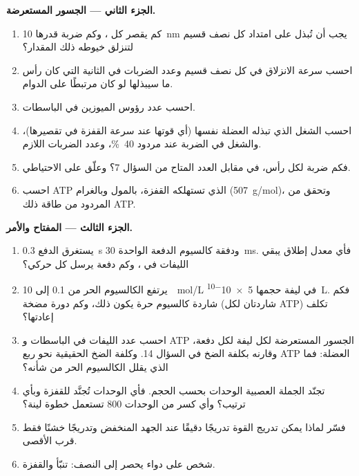 \begin{problem}
\medskip
\noindent\textbf{الجزء الثاني --- الجسور المستعرضة.}
\begin{enumerate}[resume]
  \item كم يقصر كل ، وكم ضربة قدرها
        \qty{10}{nm} يجب أن تُبذل على امتداد كل نصف قسيم
        لتنزلق خيوطه ذلك المقدار؟
  \item احسب سرعة الانزلاق في كل نصف قسيم وعدد
        الضربات في الثانية التي كان رأس ما سيبذلها لو كان
        مرتبطًا على الدوام.
  \item احسب عدد رؤوس الميوزين في الباسطات.
  \item احسب الشغل الذي تبذله العضلة نفسها (أي قوتها عند
        سرعة القفزة في تقصيرها)، والشغل في الضربة عند
        مردود \qty{40}{\%}، وعدد الضربات اللازم.
  \item فكم ضربة لكل رأس، في مقابل العدد
        المتاح من السؤال 7؟ وعلّق على الاحتياطي.
  \item احسب ATP الذي تستهلكه القفزة، بالمول وبالغرام
        (\qty{507}{g/mol})، وتحقق من المردود من طاقة
        ذلك ATP.
\end{enumerate}

\medskip
\noindent\textbf{الجزء الثالث --- المفتاح والأمر.}
\begin{enumerate}[resume]
  \item يستغرق الدفع \qty{0.3}{s} ودفقة كالسيوم الدفعة
        الواحدة \qty{30}{ms}. فأي معدل إطلاق يبقي الليفات في
        ، وكم دفعة يرسل كل  حركي؟
  \item يرتفع الكالسيوم الحر من \qty{0.1}{} إلى \qty{10}{\micro
        mol/L} في ليفة حجمها \qty{5e-10}{L}. فكم شاردة كالسيوم حرة
        يكون ذلك، وكم دورة مضخة (شاردتان لكل ATP) تكلف
        إعادتها؟
  \item احسب عدد الليفات في الباسطات و
        ATP الجسور المستعرضة لكل ليفة لكل دفعة، وقارنه
        بكلفة الضخ في السؤال 14. وكلفة الضخ الحقيقية نحو
        ربع ATP العضلة: فما الذي يقلل الكالسيوم الحر من شأنه؟
  \item تجنّد الجملة العصبية الوحدات بحسب الحجم. فأي الوحدات
        تُجنَّد للقفزة وبأي ترتيب؟ وأي كسر
        من الوحدات \num{800} تستعمل خطوة لينة؟
  \item فسّر لماذا يمكن تدريج القوة تدريجًا دقيقًا عند الجهد المنخفض
        وتدريجًا خشنًا فقط قرب الأقصى.
  \item شخص على دواء يحصر 
        إلى النصف: تنبّأ   والقفزة.
\end{enumerate}


\end{problem}
